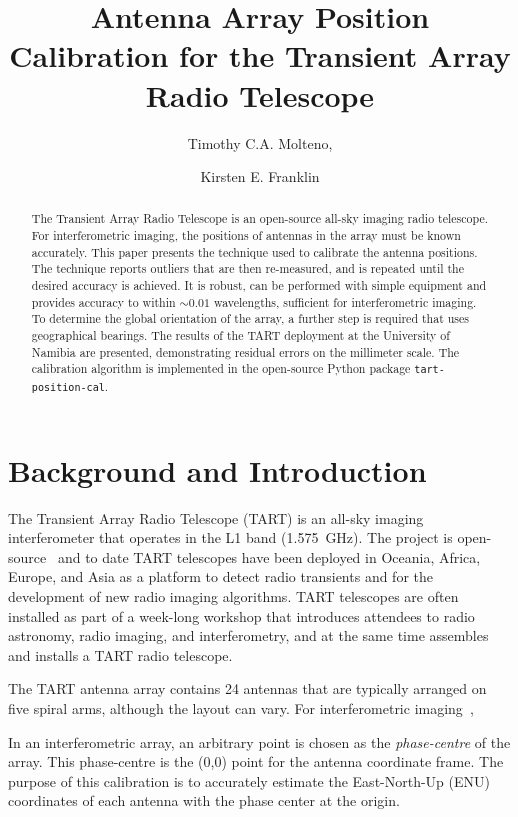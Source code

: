 \documentclass[twocolumn, a4paper,10pt]{article}
\title{Antenna Array Position Calibration for the Transient Array Radio Telescope}
\author[1,2,*]{Timothy C.A. Molteno, \orcidlink{0000-0002-2022-0380}}
\author[1]{Kirsten E. Franklin}
\affil[1]{Department of Physics, University of Otago, Box 56, Dunedin, New Zealand}
\affil[2]{Department of Physics \& Electronics, Rhodes University, Makhanda, South Africa}
\affil[*]{Corresponding Author: tim.molteno@otago.ac.nz}
\begin{document}
\maketitle

\begin{abstract}
	The Transient Array Radio Telescope is an open-source all-sky imaging radio telescope.  For interferometric imaging, the positions of antennas in the array must be known accurately. This paper presents the technique used to calibrate the antenna positions. The technique reports outliers that are then re-measured, and is repeated until the desired accuracy is achieved. It is robust, can be performed with simple equipment and provides accuracy to within $\sim 0.01$ wavelengths, sufficient for interferometric imaging. To determine the global orientation of the array, a further step is required that uses geographical bearings. The results of the TART deployment at the University of Namibia are presented, demonstrating residual errors on the millimeter scale. The calibration algorithm is implemented in the open-source Python package \texttt{tart-position-cal}.
\end{abstract}

\section{Background and Introduction}


The Transient Array Radio Telescope (TART) is an all-sky imaging interferometer that operates in the L1 band (1.575~GHz). The project is open-source~\cite{tart} and to date  TART telescopes have been deployed in Oceania, Africa, Europe, and Asia as a platform to detect radio transients and for the development of new radio imaging algorithms. TART telescopes are often installed as part of a week-long workshop that introduces attendees to radio astronomy, radio imaging, and interferometry, and at the same time assembles and installs a TART radio telescope.

The TART antenna array contains 24 antennas that are typically arranged on five spiral arms, although the layout can vary. For interferometric imaging~\cite{thomsonmoranswenson},

In an interferometric array, an arbitrary point is chosen as the {\em phase-centre} of the array. This phase-centre is the (0,0) point for the antenna coordinate frame. The purpose of this calibration is to accurately estimate the East-North-Up (ENU) coordinates of each antenna with the phase center at the origin.
\end{document}
